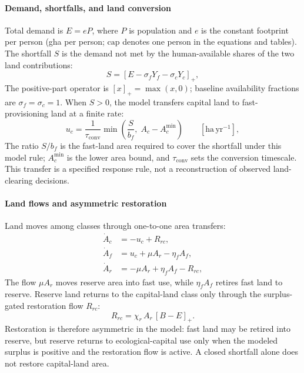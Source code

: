\documentclass[preprint,12pt,authoryear]{elsarticle}
\newcommand{\pos}[1]{\left[#1\right]_+}
\newcommand{\Acmin}{A_c^{\min}}
\newcommand{\tconv}{\tau_{\mathrm{conv}}}
\begin{document}
\paragraph{Demand, shortfalls, and land conversion} Total demand is $E=eP$, where $P$ is population and $e$ is the constant footprint per person (gha per person; $\mathrm{cap}$ denotes one person in the equations and tables). The shortfall $S$ is the demand not met by the human-available shares of the two land contributions:
\begin{equation}\label{eq:S}
S=\pos{E-\sigma_f Y_f-\sigma_c Y_c},
\end{equation}
The positive-part operator is $\pos{x}=\max(x,0)$; baseline availability fractions are $\sigma_f=\sigma_c=1$. When $S>0$, the model transfers capital land to fast-provisioning land at a finite rate:
\begin{equation}\label{eq:uc}u_c=\frac{1}{\tconv}\min\!\left(\frac{S}{b_f},\;A_c-\Acmin\right)\qquad[\mathrm{ha\,yr^{-1}}],
\end{equation}
The ratio $S/b_f$ is the fast-land area required to cover the shortfall under this model rule; $\Acmin$ is the lower area bound, and $\tconv$ sets the conversion timescale. This transfer is a specified response rule, not a reconstruction of observed land-clearing decisions.

\paragraph{Land flows and asymmetric restoration} Land moves among classes through one-to-one area transfers:
\begin{align}
\dot A_c&=-u_c+R_{rc},\label{eq:Ac}\\
\dot A_f&=u_c+\mu A_r-\eta_f A_f,\label{eq:Af}\\
\dot A_r&=-\mu A_r+\eta_f A_f-R_{rc},\label{eq:Ar}
\end{align}
The flow $\mu A_r$ moves reserve area into fast use, while $\eta_f A_f$ retires fast land to reserve. Reserve land returns to the capital-land class only through the surplus-gated restoration flow $R_{rc}$:
\begin{equation}\label{eq:Rrc}
R_{rc}=\chi_r\,A_r\,\pos{B-E}.
\end{equation}
Restoration is therefore asymmetric in the model: fast land may be retired into reserve, but reserve returns to ecological-capital use only when the modeled surplus is positive and the restoration flow is active. A closed shortfall alone does not restore capital-land area.
\end{document}

